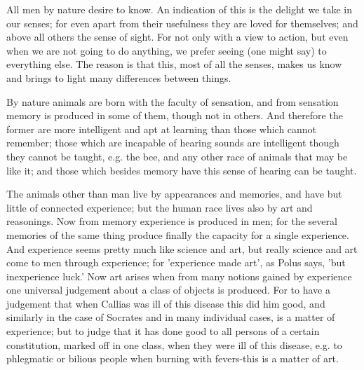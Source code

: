 \documentclass{article}
\begin{document}
All men by nature desire to know. An indication of this is the delight we take in our senses; for even apart from their usefulness they are loved for themselves; and above all others the sense of sight. For not only with a view to action, but even when we are not going to do anything, we prefer seeing (one might say) to everything else. The reason is that this, most of all the senses, makes us know and brings to light many differences between things.

By nature animals are born with the faculty of sensation, and from sensation memory is produced in some of them, though not in others. And therefore the former are more intelligent and apt at learning than those which cannot remember; those which are incapable of hearing sounds are intelligent though they cannot be taught, e.g. the bee, and any other race of animals that may be like it; and those which besides memory have this sense of hearing can be taught.

The animals other than man live by appearances and memories, and have but little of connected experience; but the human race lives also by art and reasonings. Now from memory experience is produced in men; for the several memories of the same thing produce finally the capacity for a single experience. And experience seems pretty much like science and art, but really science and art come to men through experience; for 'experience made art', as Polus says, 'but inexperience luck.' Now art arises when from many notions gained by experience one universal judgement about a class of objects is produced. For to have a judgement that when Callias was ill of this disease this did him good, and similarly in the case of Socrates and in many individual cases, is a matter of experience; but to judge that it has done good to all persons of a certain constitution, marked off in one class, when they were ill of this disease, e.g. to phlegmatic or bilious people when burning with fevers-this is a matter of art.
\end{document}
